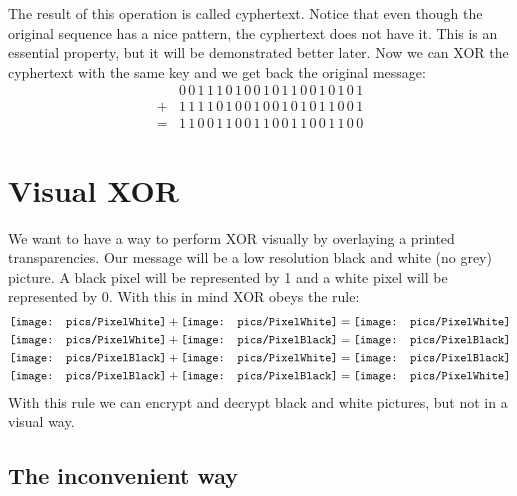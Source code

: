 \documentclass[a4paper,10pt]{article}
\newcommand{\pxWhite}{
 {\mathchoice
  {\texttt{[image: pics/PixelWhite]}}
  {\texttt{[image: pics/PixelWhite]}}
  {\texttt{[image: pics/PixelWhite]}}
  {\texttt{[image: pics/PixelWhite]}}
 }
}
\newcommand{\LL}{\mathord{\texttt{[image: pics/L]}}}
\newcommand{\RR}{\mathord{\texttt{[image: pics/R]}}}
\newcommand{\BB}{\mathord{\texttt{[image: pics/B]}}}
\newcommand{\pxBlack}{\mathord{\texttt{[image: pics/PixelBlack]}}}
\begin{document}
The result of this operation is called cyphertext. Notice that even though the original sequence has a nice pattern, the cyphertext does not have it. This is an essential property, but it will be demonstrated better later. Now we can XOR the cyphertext with the same key and we get back the original message:
\begin{equation*}
\begin{array}{rl}
  & 0\,0\,1\,1\,1\,0\,1\,0\,0\,1\,0\,1\,1\,0\,0\,1\,0\,1\,0\,1 \\
+ & 1\,1\,1\,1\,0\,1\,0\,0\,1\,0\,0\,1\,0\,1\,0\,1\,1\,0\,0\,1\\ \hline
= & 1\,1\,0\,0\,1\,1\,0\,0\,1\,1\,0\,0\,1\,1\,0\,0\,1\,1\,0\,0
\end{array}
\end{equation*}

\section{Visual XOR}

We want to have a way to perform XOR visually by overlaying a printed transparencies. Our message will be a low resolution black and white (no grey) picture. A black pixel will be represented by 1 and a white pixel will be represented by 0. With this in mind XOR obeys the rule:
\begin{align*}
 \pxWhite+\pxWhite=\pxWhite \\
 \pxWhite+\pxBlack=\pxBlack \\
 \pxBlack+\pxWhite=\pxBlack \\
 \pxBlack+\pxBlack=\pxWhite
\end{align*}
With this rule we can encrypt and decrypt black and white pictures, but not in a visual way.



\subsection{The inconvenient way}
\end{document}
